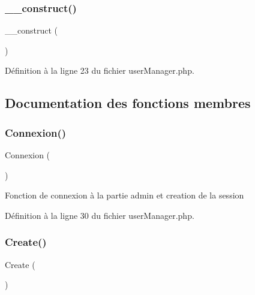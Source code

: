 \subsubsection{\texorpdfstring{\+\_\+\+\_\+construct()}{\_\_construct()}}
{\footnotesize\ttfamily \+\_\+\+\_\+construct (\begin{DoxyParamCaption}{ }\end{DoxyParamCaption})}



Définition à la ligne 23 du fichier user\+Manager.\+php.



\subsection{Documentation des fonctions membres}
\mbox{\label{class_src_1_1_managers_1_1user_manager_a00fdd5c0ca353b468ea33fb246c28d90}} 
\subsubsection{\texorpdfstring{Connexion()}{Connexion()}}
{\footnotesize\ttfamily Connexion (\begin{DoxyParamCaption}{ }\end{DoxyParamCaption})}

Fonction de connexion à la partie admin et creation de la session 

Définition à la ligne 30 du fichier user\+Manager.\+php.

\mbox{\label{class_src_1_1_managers_1_1user_manager_ad01f71fa0ecc039494e3c282864298c3}} 
\subsubsection{\texorpdfstring{Create()}{Create()}}
{\footnotesize\ttfamily Create (\begin{DoxyParamCaption}{ }\end{DoxyParamCaption})}

